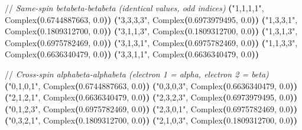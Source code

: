 \documentclass[
  11pt,
  oneside]{book}
\newenvironment{Shaded}{\begin{snugshade}}{\end{snugshade}}
\newcommand{\CommentTok}[1]{\textcolor[rgb]{0.56,0.35,0.01}{\textit{#1}}}
\newcommand{\FloatTok}[1]{\textcolor[rgb]{0.00,0.00,0.81}{#1}}
\newcommand{\NormalTok}[1]{#1}
\newcommand{\OperatorTok}[1]{\textcolor[rgb]{0.81,0.36,0.00}{\textbf{#1}}}
\newcommand{\StringTok}[1]{\textcolor[rgb]{0.31,0.60,0.02}{#1}}
\begin{document}
\begin{Shaded}
\begin{Highlighting}[]
\NormalTok{    //}\CommentTok{ Same{-}spin betabeta{-}betabeta (identical values, odd indices)}
    \OperatorTok{(}\StringTok{"1,1,1,1"}\NormalTok{, Complex}\OperatorTok{(}\FloatTok{0.6744887663}\NormalTok{, }\FloatTok{0.0}\OperatorTok{))}
    \OperatorTok{(}\StringTok{"3,3,3,3"}\NormalTok{, Complex}\OperatorTok{(}\FloatTok{0.6973979495}\NormalTok{, }\FloatTok{0.0}\OperatorTok{))}
    \OperatorTok{(}\StringTok{"1,3,3,1"}\NormalTok{, Complex}\OperatorTok{(}\FloatTok{0.1809312700}\NormalTok{, }\FloatTok{0.0}\OperatorTok{))}
    \OperatorTok{(}\StringTok{"3,1,1,3"}\NormalTok{, Complex}\OperatorTok{(}\FloatTok{0.1809312700}\NormalTok{, }\FloatTok{0.0}\OperatorTok{))}
    \OperatorTok{(}\StringTok{"1,3,1,3"}\NormalTok{, Complex}\OperatorTok{(}\FloatTok{0.6975782469}\NormalTok{, }\FloatTok{0.0}\OperatorTok{))}
    \OperatorTok{(}\StringTok{"3,1,3,1"}\NormalTok{, Complex}\OperatorTok{(}\FloatTok{0.6975782469}\NormalTok{, }\FloatTok{0.0}\OperatorTok{))}
    \OperatorTok{(}\StringTok{"1,1,3,3"}\NormalTok{, Complex}\OperatorTok{(}\FloatTok{0.6636340479}\NormalTok{, }\FloatTok{0.0}\OperatorTok{))}
    \OperatorTok{(}\StringTok{"3,3,1,1"}\NormalTok{, Complex}\OperatorTok{(}\FloatTok{0.6636340479}\NormalTok{, }\FloatTok{0.0}\OperatorTok{))}

\NormalTok{    //}\CommentTok{ Cross{-}spin alphabeta{-}alphabeta (electron 1 = alpha, electron 2 = beta)}
    \OperatorTok{(}\StringTok{"0,1,0,1"}\NormalTok{, Complex}\OperatorTok{(}\FloatTok{0.6744887663}\NormalTok{, }\FloatTok{0.0}\OperatorTok{))}
    \OperatorTok{(}\StringTok{"0,3,0,3"}\NormalTok{, Complex}\OperatorTok{(}\FloatTok{0.6636340479}\NormalTok{, }\FloatTok{0.0}\OperatorTok{))}
    \OperatorTok{(}\StringTok{"2,1,2,1"}\NormalTok{, Complex}\OperatorTok{(}\FloatTok{0.6636340479}\NormalTok{, }\FloatTok{0.0}\OperatorTok{))}
    \OperatorTok{(}\StringTok{"2,3,2,3"}\NormalTok{, Complex}\OperatorTok{(}\FloatTok{0.6973979495}\NormalTok{, }\FloatTok{0.0}\OperatorTok{))}
    \OperatorTok{(}\StringTok{"0,1,2,3"}\NormalTok{, Complex}\OperatorTok{(}\FloatTok{0.6975782469}\NormalTok{, }\FloatTok{0.0}\OperatorTok{))}
    \OperatorTok{(}\StringTok{"2,3,0,1"}\NormalTok{, Complex}\OperatorTok{(}\FloatTok{0.6975782469}\NormalTok{, }\FloatTok{0.0}\OperatorTok{))}
    \OperatorTok{(}\StringTok{"0,3,2,1"}\NormalTok{, Complex}\OperatorTok{(}\FloatTok{0.1809312700}\NormalTok{, }\FloatTok{0.0}\OperatorTok{))}
    \OperatorTok{(}\StringTok{"2,1,0,3"}\NormalTok{, Complex}\OperatorTok{(}\FloatTok{0.1809312700}\NormalTok{, }\FloatTok{0.0}\OperatorTok{))}


\end{Highlighting}
\end{Shaded}
\end{document}
